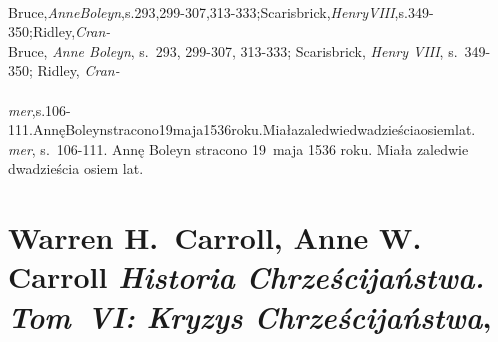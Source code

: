 \documentclass[a4paper,11pt]{article}
\begin{document}
\begin{center}
\begin{tabular}{|c|c|c|c|c|}
    \hline
  \end{tabular}

\end{center}

\VerSpaceSix


\noindent
{} \\
\Jest Bruce,\textit{AnneBoleyn},s.293,299-307,313-333;Scarisbrick,\textit{HenryVIII},s.349-350;Ridley,\textit{Cran-} \\
\Powin Bruce, \textit{Anne Boleyn}, s.~293, 299-307, 313-333; Scarisbrick,
\textit{Henry VIII}, s.~349-350; Ridley, \textit{Cran-} \\
 \\
\Jest
\textit{mer},s.106-111.AnnęBoleynstracono19maja1536roku.Miałazaledwiedwadzieściaosiemlat. \\
\Powin \textit{mer}, s.~106-111. Annę Boleyn stracono 19~maja 1536 roku.
Miała zaledwie dwadzieścia osiem lat. \\












\section{Warren H.~Carroll, Anne W. Carroll
  \textit{Historia Chrześcijaństwa. Tom~VI: Kryzys Chrześcijaństwa},
  \cite{CarrollCarrollHistoriaChrzecijanstwaVolVI2014}}
\end{document}

